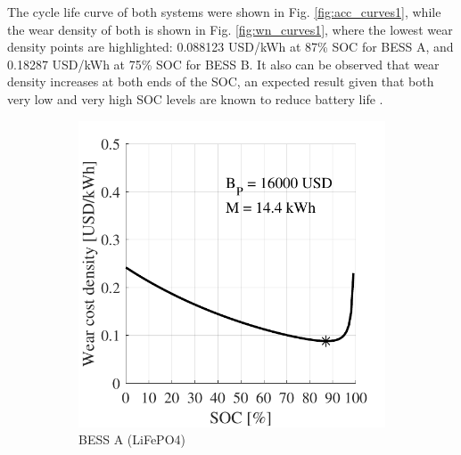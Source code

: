 \documentclass{ieeeaccess}
\begin{document}
    The cycle life curve of both systems were shown in Fig. \ref{fig:acc_curves1}, while the wear density of both is shown in Fig. \ref{fig:wn_curves1}, where the lowest wear density points are highlighted: 0.088123 USD/kWh at 87\% \ac{SOC} for \ac{BESS} A, and 0.18287 USD/kWh at 75\% \ac{SOC} for \ac{BESS} B. It also can be observed that wear density increases at both ends of the \ac{SOC}, an expected result given that both very low and very high \ac{SOC} levels are known to reduce battery life \cite{ECKER2014, WIKNER2018}.
    \begin{figure}[!h]
        \begin{subfigure}{.235\textwidth}
            \centering
            \includegraphics[width=\linewidth]{figures/marginal_NeoVolta_NV24_LiFePO4.pdf}
            \caption{\ac{BESS} A (LiFePO4)}
            \label{fig:wn_curves1A}
        \end{subfigure}
        \begin{subfigure}{.235\textwidth}
            \centering

\end{subfigure}
\end{figure}
\end{document}
